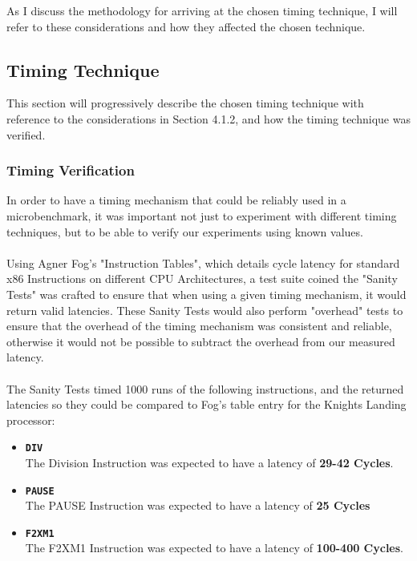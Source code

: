 \documentclass[bsc,frontabs,twoside,singlespacing,parskip,deptreport]{infthesis}     %
\begin{document}
As I discuss the methodology for arriving at the chosen timing technique, I will refer to these considerations and how they affected the chosen technique.

\subsection{Timing Technique}
This section will progressively describe the chosen timing technique with reference to the considerations in Section 4.1.2, and how the timing technique was verified.

\subsubsection{Timing Verification}
In order to have a timing mechanism that could be reliably used in a microbenchmark, it was important not just to experiment with different timing techniques, but to be able to verify our experiments using known values. \\
\\
Using Agner Fog's "Instruction Tables"\cite{inst_tables}, which details cycle latency for standard x86 Instructions on different CPU Architectures, a test suite coined the "Sanity Tests" was crafted to ensure that when using a given timing mechanism, it would return valid latencies. These Sanity Tests would also perform "overhead" tests to ensure that the overhead of the timing mechanism was consistent and reliable, otherwise it would not be possible to subtract the overhead from our measured latency. \\
\\
The Sanity Tests timed 1000 runs of the following instructions, and the returned latencies so they could be compared to Fog's table entry for the Knights Landing processor:
\begin{itemize}
    \item{{\bf \texttt{DIV}} \\
        The Division Instruction was expected to have a latency of \textbf{29-42 Cycles}.
    }
    \item{{\bf \texttt{PAUSE}} \\
        The PAUSE Instruction was expected to have a latency of \textbf{25 Cycles}
    }
    \item{{\bf \texttt{F2XM1}} \\
        The F2XM1 Instruction was expected to have a latency of \textbf{100-400 Cycles}.
    }
\end{itemize}
\end{document}
